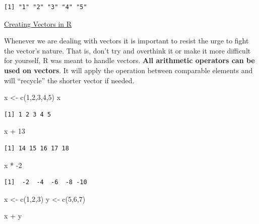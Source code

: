 \documentclass[
  letterpaper,
  DIV=11,
  numbers=noendperiod]{scrreprt}
\newenvironment{Shaded}{\begin{snugshade}}{\end{snugshade}}
\newcommand{\DecValTok}[1]{\textcolor[rgb]{0.68,0.00,0.00}{#1}}
\newcommand{\FunctionTok}[1]{\textcolor[rgb]{0.28,0.35,0.67}{#1}}
\newcommand{\NormalTok}[1]{\textcolor[rgb]{0.00,0.23,0.31}{#1}}
\newcommand{\OtherTok}[1]{\textcolor[rgb]{0.00,0.23,0.31}{#1}}
\newcommand{\SpecialCharTok}[1]{\textcolor[rgb]{0.37,0.37,0.37}{#1}}
\begin{document}
\begin{verbatim}
[1] "1" "2" "3" "4" "5"
\end{verbatim}

\begin{watch}{}{}
    \href{https://youtu.be/vhNnJbHhPzE}{Creating Vectors in R}
\end{watch}

Whenever we are dealing with vectors it is important to resist the urge
to fight the vector's nature. That is, don't try and overthink it or
make it more difficult for yourself, R was meant to handle vectors.
\textbf{All arithmetic operators can be used on vectors}. It will apply
the operation between comparable elements and will ``recycle'' the
shorter vector if needed.

\begin{Shaded}
\begin{Highlighting}[]
\NormalTok{x }\OtherTok{\textless{}{-}} \FunctionTok{c}\NormalTok{(}\DecValTok{1}\NormalTok{,}\DecValTok{2}\NormalTok{,}\DecValTok{3}\NormalTok{,}\DecValTok{4}\NormalTok{,}\DecValTok{5}\NormalTok{)}
\NormalTok{x}
\end{Highlighting}
\end{Shaded}

\begin{verbatim}
[1] 1 2 3 4 5
\end{verbatim}

\begin{Shaded}
\begin{Highlighting}[]
\NormalTok{x }\SpecialCharTok{+} \DecValTok{13}
\end{Highlighting}
\end{Shaded}

\begin{verbatim}
[1] 14 15 16 17 18
\end{verbatim}

\begin{Shaded}
\begin{Highlighting}[]
\NormalTok{x }\SpecialCharTok{*} \SpecialCharTok{{-}}\DecValTok{2}
\end{Highlighting}
\end{Shaded}

\begin{verbatim}
[1]  -2  -4  -6  -8 -10
\end{verbatim}

\begin{Shaded}
\begin{Highlighting}[]
\NormalTok{x }\OtherTok{\textless{}{-}} \FunctionTok{c}\NormalTok{(}\DecValTok{1}\NormalTok{,}\DecValTok{2}\NormalTok{,}\DecValTok{3}\NormalTok{)}
\NormalTok{y }\OtherTok{\textless{}{-}} \FunctionTok{c}\NormalTok{(}\DecValTok{5}\NormalTok{,}\DecValTok{6}\NormalTok{,}\DecValTok{7}\NormalTok{)}

\NormalTok{x }\SpecialCharTok{+}\NormalTok{ y}
\end{Highlighting}
\end{Shaded}
\end{document}
